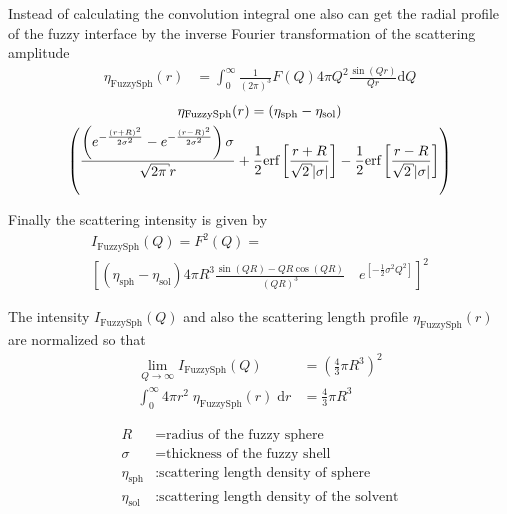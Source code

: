 Instead of calculating the convolution integral one also can get
the radial profile of the fuzzy interface by the inverse Fourier
transformation of the scattering amplitude
\begin{align}
\eta_\text{FuzzySph}(r) &= \int_0^{\infty}
\frac{1}{\left(2\pi\right)^3} F(Q) 4\pi Q^2 \frac{\sin\left(Qr\right)}{Qr} \mathrm{d}Q
\end{align}
\begin{multline}
\eta_\text{FuzzySph}(r) = \left(\eta_\text{sph}-\eta_\text{sol}\right) \\
\left( \frac{
    \left(
          e^{-\frac{\left(r + R\right)^2}{2 \sigma^2}}
        - e^{-\frac{\left(r - R\right)^2}{2 \sigma^2}}
    \right) \sigma}{\sqrt{2 \pi} r}
 + \frac{1}{2} \text{erf}\left[\frac{r + R}{\sqrt{2} \abs{\sigma}}\right]
 - \frac{1}{2} \text{erf}\left[\frac{r - R}{\sqrt{2} \abs{\sigma}}\right]
\right)
\end{multline}

Finally the scattering intensity is given by
\begin{multline}
I_\text{FuzzySph}(Q) = F^2(Q) = \\
\left[ \left(\eta_\text{sph}-\eta_\text{sol}\right) 4\pi R^3
   \frac{\sin\left(QR\right)-QR\cos\left(QR\right)}{\left(QR\right)^3} \quad e^{\left[-\frac{1}{2}\sigma^2Q^2\right]}
\right]^2
\end{multline}

The intensity $I_\text{FuzzySph}(Q)$ and also the scattering
length profile $\eta_\text{FuzzySph}(r)$ are normalized so that
\begin{align*}
 \lim_{Q \to \infty} I_\text{FuzzySph}(Q) &= \left( \frac{4}{3}\pi R^3\right)^2 \\
 \int_0^{\infty} 4\pi r^2 \; \eta_\text{FuzzySph}(r) \; \mathrm{d}r &=\frac{4}{3}\pi R^3
\end{align*}

\begin{align}
R &=\text{radius of the fuzzy sphere} \nonumber\\
\sigma &=\text{thickness of the fuzzy shell} \nonumber\\
\eta_\text{sph}   & : \text{scattering length density of sphere} \nonumber \\
\eta_\text{sol}   & : \text{scattering length density of the solvent} \nonumber \\
\end{align}


